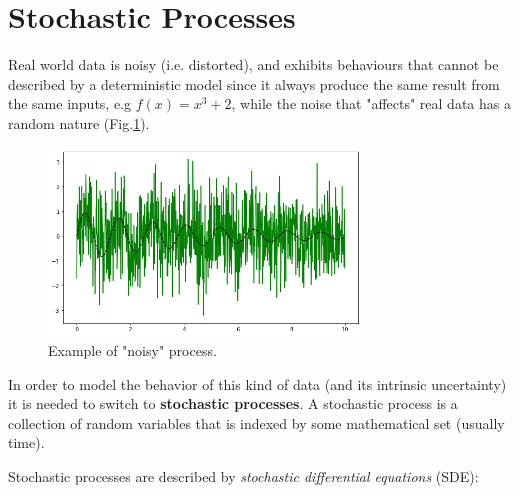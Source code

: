 \documentclass[12pt,a4paper]{book}
\begin{document}
\section{Stochastic Processes}
Real world data is noisy (i.e. distorted), and exhibits behaviours that cannot be described by a deterministic model since it always produce the same result from  the same inputs, e.g $f(x)=x^3+2$, while the noise that "affects" real data has a random nature (Fig.\ref{fig:noisy_process}).
\begin{figure}[htbp]
	\begin{center}  
	\includegraphics[height=5cm]{stochastic_process}
	\end{center}
\caption{Example of "noisy" process.}
\label{fig:noisy_process}
\end{figure}

In order to model the behavior of this kind of data (and its intrinsic uncertainty) it is needed to switch to \textbf{stochastic processes}.  
A stochastic process is a collection of random variables that is indexed by some mathematical set (usually time).

Stochastic processes are described by \emph{stochastic differential equations} (SDE):
	
\end{document}
